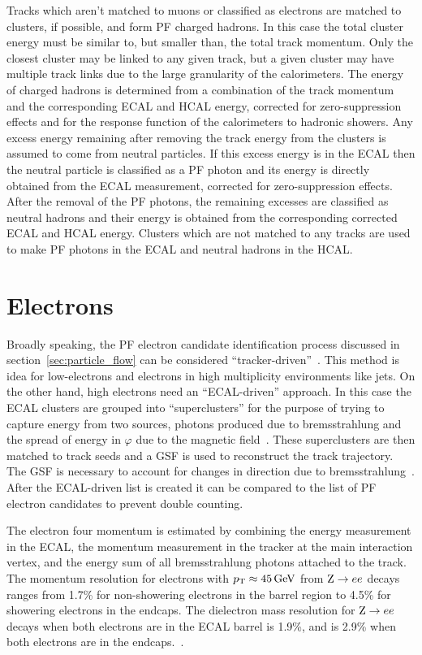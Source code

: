 Tracks which aren't matched to muons or classified as electrons are matched to clusters, if possible, and form PF charged hadrons.
In this case the total cluster energy must be similar to, but smaller than, the total track momentum.
Only the closest cluster may be linked to any given track, but a given cluster may have multiple track links due to the large granularity of the calorimeters.
The energy of charged hadrons is determined from a combination of the track momentum and the corresponding ECAL and HCAL energy, corrected for zero-suppression effects and for the response function of the calorimeters to hadronic showers.
Any excess energy remaining after removing the track energy from the clusters is assumed to come from neutral particles.
If this excess energy is in the ECAL then the neutral particle is classified as a PF photon and its energy is directly obtained from the ECAL measurement, corrected for zero-suppression effects.
After the removal of the PF photons, the remaining excesses are classified as neutral hadrons and their energy is obtained from the corresponding corrected ECAL and HCAL energy.
Clusters which are not matched to any tracks are used to make PF photons in the ECAL and neutral hadrons in the HCAL.

\section{Electrons}

Broadly speaking, the PF electron candidate identification process discussed in section~\ref{sec:particle_flow} can be considered ``tracker-driven''~\cite{CMS-PAS-EGM-10-004}.
This method is idea for low-\pt electrons and electrons in high multiplicity environments like jets.
On the other hand, high \pt electrons need an ``ECAL-driven'' approach.
In this case the ECAL clusters are grouped into ``superclusters'' for the purpose of trying to capture energy from two sources, photons produced due to bremsstrahlung and the spread of energy in $\varphi$ due to the magnetic field~\cite{ElectronReco}.
These superclusters are then matched to track seeds and a GSF is used to reconstruct the track trajectory.
The GSF is necessary to account for changes in direction due to bremsstrahlung~\cite{ElectronGSF}.
After the ECAL-driven list is created it can be compared to the list of PF electron candidates to prevent double counting.

The electron four momentum is estimated by combining the energy measurement in the ECAL, the momentum measurement in the tracker at the main interaction vertex, and the energy sum of all bremsstrahlung photons attached to the track.
The momentum resolution for electrons with $p_{\mathrm{T}} \approx 45\,\text{Ge\hspace{-.08em}V}$ from $\mathrm{Z} \rightarrow {e} {e}$ decays ranges from 1.7\% for non-showering electrons in the barrel region to 4.5\% for showering electrons in the endcaps.
The dielectron mass resolution for $\mathrm{Z} \rightarrow {e} {e}$ decays when both electrons are in the ECAL barrel is 1.9\%, and is 2.9\% when both electrons are in the endcaps.~\cite{Khachatryan:2015hwa}.

